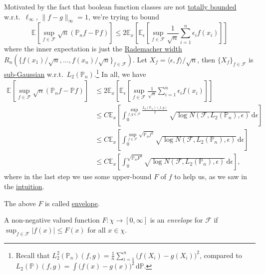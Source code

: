 \begin{prev}
	Motivated by the fact that boolean function classes are not \hyperref[def:totally-bounded]{totally bounded} w.r.t.\ \(\ell _\infty \), \(\lVert f - g \rVert _\infty = 1\), we're trying to bound
	\[
		\mathbb{E}_{}\left[\sup _{f\in \mathscr{F} } \sqrt{n} (\mathbb{P} _n f - \mathbb{P} f) \right]
		\leq 2 \mathbb{E}_{x}\left[\mathbb{E}_{\epsilon }\left[\sup _{f\in \mathscr{F} } \frac{1}{\sqrt{n} } \sum_{i=1}^{n} \epsilon _i f(x_i) \right]  \right]
	\]
	where the inner expectation is just the \hyperref[def:Rademacher-width]{Rademacher width} \(R_n (\{ f(x_1) / \sqrt{n} , \dots , f(x_n) / \sqrt{n} \}_{f\in \mathscr{F} } )\). Let \(X_f = \langle \epsilon , f \rangle / \sqrt{n} \), then \(\{ X_f \} _{f\in \mathscr{F} }\) is \hyperref[def:sub-Gaussian-process]{sub-Gaussian} w.r.t.\ \(L_2(\mathbb{P} _n)\).\footnote{Recall that \(L_2^2(\mathbb{P} _n)(f, g) = \frac{1}{n}\sum_{i=1}^{n} \big(f(X_i) - g(X_i)\big)^2\), compared to \(L_2(\mathbb{P} )(f, g) = \int \big(f(x) - g(x)\big)^2 \,\mathrm{d} \mathbb{P} \).} In all, we have
	\[
		\begin{split}
			\mathbb{E}_{}\left[\sup _{f\in \mathscr{F} } \sqrt{n} (\mathbb{P} _n f - \mathbb{P} f) \right]
			&\leq 2 \mathbb{E}_{x}\left[\mathbb{E}_{\epsilon }\left[\sup _{f\in \mathscr{F} } \frac{1}{\sqrt{n} } \sum_{i=1}^{n} \epsilon _i f(x_i) \right]  \right] \\
			&\leq C\mathbb{E}_{x}\left[ \int_{0}^{\sup\limits _{f, g\in \mathscr{F} } \frac{L_2(\mathbb{P} _n)(f, g)}{2} } \sqrt{\log N(\mathscr{F} , L_2(\mathbb{P} _n), \epsilon )} \,\mathrm{d}\epsilon \right]\\
			& \leq C\mathbb{E}_{x}\left[ \int_{0}^{\sup\limits _{f\in \mathscr{F} } \sqrt{\mathbb{P} _n f^2} } \sqrt{\log N(\mathscr{F} , L_2(\mathbb{P} _n), \epsilon )} \,\mathrm{d}\epsilon \right]\\
			& \leq C\mathbb{E}_{x}\left[ \int_{0}^{\sqrt{\mathbb{P} _n F^2} } \sqrt{\log N(\mathscr{F} , L_2(\mathbb{P} _n), \epsilon )} \,\mathrm{d}\epsilon \right],
		\end{split}
	\]
	where in the last step we use some upper-bound \(F\) of \(f\) to help us, as we saw in the \hyperref[int:main-bound]{intuition}.
\end{prev}

The above \(F\) is called \hyperref[def:envelope]{envelope}.

\begin{definition}[Envelope]\label{def:envelope}
	A non-negative valued function \(F\colon \chi \to [0, \infty ]\) is an \emph{envelope} for \(\mathscr{F} \) if \(\sup _{f\in\mathscr{F} } \vert f(x) \vert \leq F(x)\) for all \(x\in \chi \).
\end{definition}

